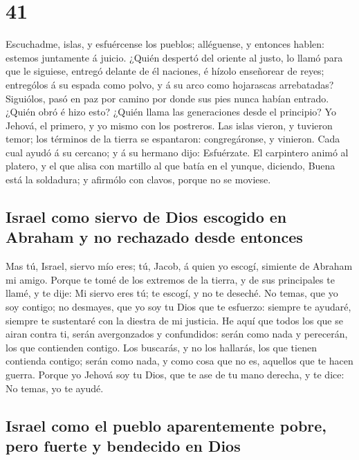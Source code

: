 \hypertarget{section-40}{%
\section{41}\label{section-40}}

 Escuchadme, islas, y esfuércense los pueblos; alléguense, y
entonces hablen: estemos juntamente á juicio.  ¿Quién
despertó del oriente al justo, lo llamó para que le siguiese, entregó
delante de él naciones, é hízolo enseñorear de reyes; entrególos á su
espada como polvo, y á su arco como hojarascas arrebatadas? 
Siguiólos, pasó en paz por camino por donde sus pies nunca habían
entrado.  ¿Quién obró é hizo esto? ¿Quién llama las
generaciones desde el principio? Yo Jehová, el primero, y yo mismo con
los postreros.  Las islas vieron, y tuvieron temor; los
términos de la tierra se espantaron: congregáronse, y vinieron.
 Cada cual ayudó á su cercano; y á su hermano dijo:
Esfuérzate.  El carpintero animó al platero, y el que alisa
con martillo al que batía en el yunque, diciendo, Buena está la
soldadura; y afirmólo con clavos, porque no se moviese.

\hypertarget{israel-como-siervo-de-dios-escogido-en-abraham-y-no-rechazado-desde-entonces}{%
\subsection{Israel como siervo de Dios escogido en Abraham y no
rechazado desde
entonces}\label{israel-como-siervo-de-dios-escogido-en-abraham-y-no-rechazado-desde-entonces}}

 Mas tú, Israel, siervo mío eres; tú, Jacob, á quien yo
escogí, simiente de Abraham mi amigo.  Porque te tomé de los
extremos de la tierra, y de sus principales te llamé, y te dije: Mi
siervo eres tú; te escogí, y no te deseché.  No temas, que
yo soy contigo; no desmayes, que yo soy tu Dios que te esfuerzo: siempre
te ayudaré, siempre te sustentaré con la diestra de mi justicia.
 He aquí que todos los que se airan contra ti, serán
avergonzados y confundidos: serán como nada y perecerán, los que
contienden contigo.  Los buscarás, y no los hallarás, los
que tienen contienda contigo; serán como nada, y como cosa que no es,
aquellos que te hacen guerra.  Porque yo Jehová soy tu
Dios, que te ase de tu mano derecha, y te dice: No temas, yo te ayudé.

\hypertarget{israel-como-el-pueblo-aparentemente-pobre-pero-fuerte-y-bendecido-en-dios}{%
\subsection{Israel como el pueblo aparentemente pobre, pero fuerte y
bendecido en
Dios}\label{israel-como-el-pueblo-aparentemente-pobre-pero-fuerte-y-bendecido-en-dios}}

